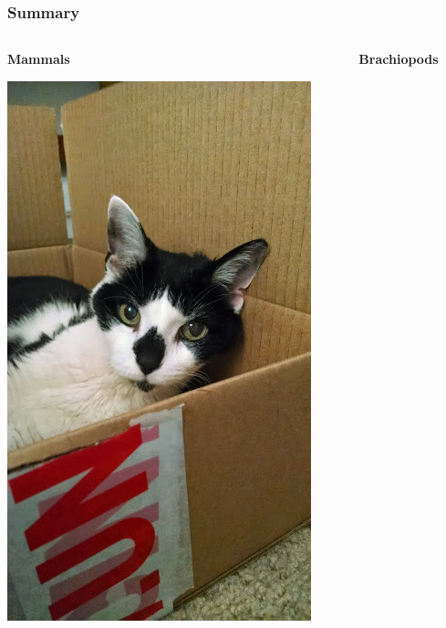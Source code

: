 \documentclass{beamer}
\begin{document}
\begin{frame}
  \frametitle{Summary}
  \begin{columns}
    \begin{column}{0.5\textwidth}
      \begin{center}
        \textbf{Mammals}

        \vspace{0.5cm}

        \includegraphics[height = 0.555\textheight, keepaspectratio = true]{figure/monty}
      \end{center}
    \end{column}
    \begin{column}{0.5\textwidth}
      \begin{center}
        \textbf{Brachiopods}
        
        \vspace{0.5cm}


\end{center}
\end{column}
\end{columns}
\end{frame}
\end{document}

